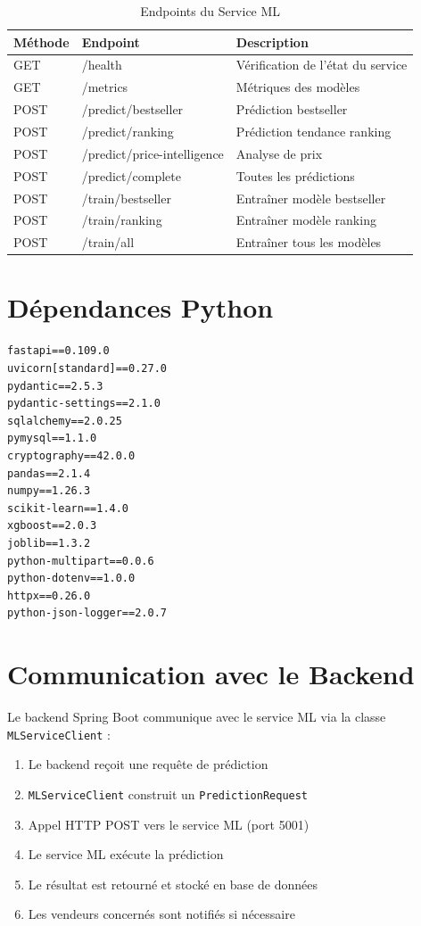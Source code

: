 \documentclass[12pt,a4paper]{report}
\begin{document}
\begin{table}[H]
    \centering
    \caption{Endpoints du Service ML}
    \begin{tabularx}{\textwidth}{llX}
        \toprule
        \textbf{Méthode} & \textbf{Endpoint} & \textbf{Description} \\
        \midrule
        GET & /health & Vérification de l'état du service \\
        GET & /metrics & Métriques des modèles \\
        POST & /predict/bestseller & Prédiction bestseller \\
        POST & /predict/ranking & Prédiction tendance ranking \\
        POST & /predict/price-intelligence & Analyse de prix \\
        POST & /predict/complete & Toutes les prédictions \\
        POST & /train/bestseller & Entraîner modèle bestseller \\
        POST & /train/ranking & Entraîner modèle ranking \\
        POST & /train/all & Entraîner tous les modèles \\
        \bottomrule
    \end{tabularx}
    \label{tab:ml_endpoints}
\end{table}

\section{Dépendances Python}

\begin{verbatim}
fastapi==0.109.0
uvicorn[standard]==0.27.0
pydantic==2.5.3
pydantic-settings==2.1.0
sqlalchemy==2.0.25
pymysql==1.1.0
cryptography==42.0.0
pandas==2.1.4
numpy==1.26.3
scikit-learn==1.4.0
xgboost==2.0.3
joblib==1.3.2
python-multipart==0.0.6
python-dotenv==1.0.0
httpx==0.26.0
python-json-logger==2.0.7
\end{verbatim}

\section{Communication avec le Backend}

Le backend Spring Boot communique avec le service ML via la classe \texttt{MLServiceClient} :

\begin{enumerate}[noitemsep]
    \item Le backend reçoit une requête de prédiction
    \item \texttt{MLServiceClient} construit un \texttt{PredictionRequest}
    \item Appel HTTP POST vers le service ML (port 5001)
    \item Le service ML exécute la prédiction
    \item Le résultat est retourné et stocké en base de données
    \item Les vendeurs concernés sont notifiés si nécessaire
\end{enumerate}
\end{document}
